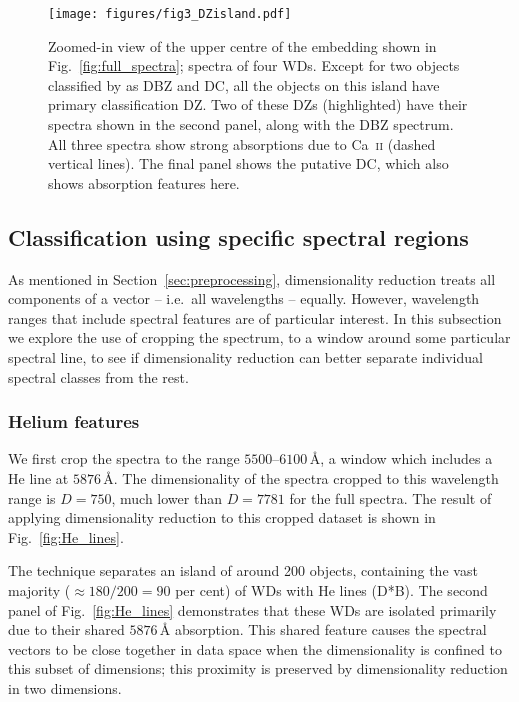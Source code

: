 \documentclass[fleqn,usenatbib]{mnras}
\begin{document}
\begin{figure}
\texttt{[image: figures/fig3\_DZisland.pdf]}
\caption{
    Zoomed-in view of the upper centre of the embedding shown in Fig.~\ref{fig:full_spectra}; spectra of four WDs.
    Except for two objects classified by \citet{manser24} as DBZ and DC, all the objects on this island have primary classification DZ.
    Two of these DZs (highlighted) have their spectra shown in the second panel, along with the DBZ spectrum.
    All three spectra show strong absorptions due to Ca~\textsc{ii} (dashed vertical lines).
    The final panel shows the putative DC, which also shows absorption features here.
}
\label{fig:DZisland}
\end{figure}

\subsection{Classification using specific spectral regions}
\label{sec:zoom}

As mentioned in Section~\ref{sec:preprocessing}, dimensionality reduction treats all components of a vector -- i.e.\ all wavelengths -- equally.
However, wavelength ranges that include spectral features are of particular interest.
In this subsection we explore the use of cropping the spectrum, to a window around some particular spectral line, to see if dimensionality reduction can better separate individual spectral classes from the rest.

\subsubsection{Helium features}
\label{sec:DBs}

We first crop the spectra to the range $5500$--$6100\,\text{\AA}$, a window which includes a He line at $5876\,\text{\AA}$.
The dimensionality of the spectra cropped to this wavelength range is $D=750$, much lower than $D=7781$ for the full spectra.
The result of applying dimensionality reduction to this cropped dataset is shown in Fig.~\ref{fig:He_lines}.

The technique separates an island of around 200 objects, containing the vast majority ($\approx 180/200=90$ per cent) of WDs with He lines (D*B).
The second panel of Fig.~\ref{fig:He_lines} demonstrates that these WDs are isolated primarily due to their shared $5876\,\text{\AA}$ absorption.
This shared feature causes the spectral vectors to be close together in data space when the dimensionality is confined to this subset of dimensions; this proximity is preserved by dimensionality reduction in two dimensions.
\end{document}

